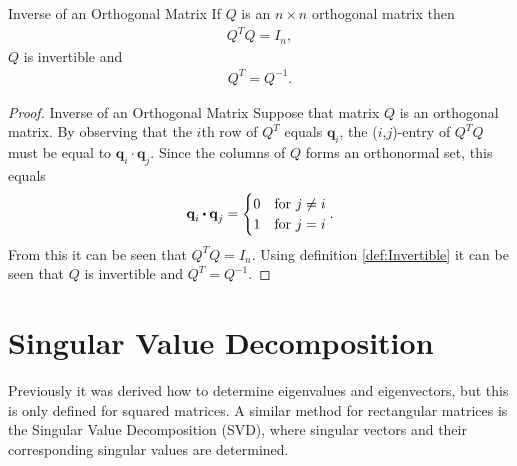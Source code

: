 \begin{theorem}{Inverse of an Orthogonal Matrix}
    If $Q$ is an $n\times n$ orthogonal matrix then
    \begin{align*}
        Q^T Q = I_n,
    \end{align*}
    $Q$ is invertible and
    \begin{align*}
        Q^T = Q^{-1}.
    \end{align*}
    \cite[413]{LiAl}
\end{theorem}
\begin{proof}{Inverse of an Orthogonal Matrix}
    Suppose that matrix $Q$ is an orthogonal matrix.
    By observing that the $i$th row of $Q^T$ equals $\textbf{q}_i$, the ($i$,$j$)-entry of $Q^TQ$ must be equal to $\textbf{q}_i\cdot\textbf{q}_j$. Since the columns of $Q$ forms an orthonormal set, this equals 
    \begin{align*}
        \textbf{q}_i\vprik\textbf{q}_j=
    \begin{cases}
          0 & \text{for } j\neq i\\
          1 & \text{for } j= i
    \end{cases}.
    \end{align*}
    From this it can be seen that $Q^TQ=I_n$. Using definition \ref{def:Invertible} it can be seen that $Q$ is invertible and $Q^T=Q^{-1}$.
    \qedsymbol 
\end{proof}
\section{Singular Value Decomposition}
Previously it was derived how to determine eigenvalues and eigenvectors, but this is only defined for squared matrices. A similar method for rectangular matrices is the Singular Value Decomposition (SVD), where singular vectors and their corresponding singular values are determined. 


